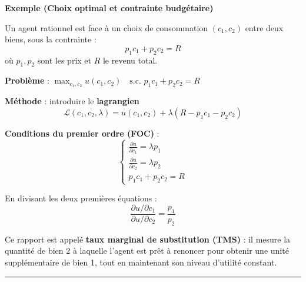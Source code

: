 \begin{f}
		\textbf{Exemple (Choix optimal et contrainte budgétaire)}
	
	Un agent rationnel est face à un choix de consommation \((c_1, c_2)\) entre deux biens, sous la contrainte :
	\[
	p_1 c_1 + p_2 c_2 = R
	\]
	où \(p_1, p_2\) sont les prix et \(R\) le revenu total.
	
	\textbf{Problème} :
	\(
	\max_{c_1, c_2} u(c_1, c_2) \quad \text{s.c. } p_1 c_1 + p_2 c_2 = R\)

	
	\textbf{Méthode} : introduire le \textbf{lagrangien}
	\[
	\mathcal{L}(c_1, c_2, \lambda) = u(c_1, c_2) + \lambda (R - p_1 c_1 - p_2 c_2)
	\]
	
	\textbf{Conditions du premier ordre (FOC)} :
	\[
	\begin{cases}
		\frac{\partial u}{\partial c_1} = \lambda p_1 \\
		\frac{\partial u}{\partial c_2} = \lambda p_2 \\
		p_1 c_1 + p_2 c_2 = R
	\end{cases}
	\]
	
	En divisant les deux premières équations :
	\[
	\frac{\partial u / \partial c_1}{\partial u / \partial c_2} = \frac{p_1}{p_2}
	\]
	
	Ce rapport est appelé \textbf{taux marginal de substitution (TMS)} : il mesure la quantité de bien 2 à laquelle l’agent est prêt à renoncer pour obtenir une unité supplémentaire de bien 1, tout en maintenant son niveau d’utilité constant.
	
\end{f}
\hrule


